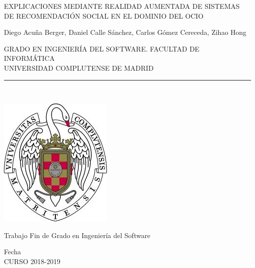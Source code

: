 \begin{center}

   \vspace{1cm}


   {\Large EXPLICACIONES MEDIANTE REALIDAD AUMENTADA DE SISTEMAS DE RECOMENDACIÓN SOCIAL EN EL DOMINIO DEL OCIO}\\

   \vspace{0.5cm}



   \vspace{0.5cm}



    Diego Acuña Berger, Daniel Calle Sánchez, Carlos Gómez Cereceda, Zihao Hong\\

   \vspace{0.5cm}




   GRADO EN INGENIERÍA DEL SOFTWARE. FACULTAD DE INFORMÁTICA\\
   UNIVERSIDAD COMPLUTENSE DE MADRID \\


   \vspace{0.65cm}
   \rule{2in}{0.5pt}\\
   \vspace{0.85cm}

  \includegraphics[height=2.5in]{figures/escudo.jpg}
  

   \vspace{0.5cm}
Trabajo Fin de Grado en Ingeniería del Software

   \vspace{0.5cm}






  Fecha\\
  CURSO 2018-2019
   \vspace{1cm}

\end{center}

